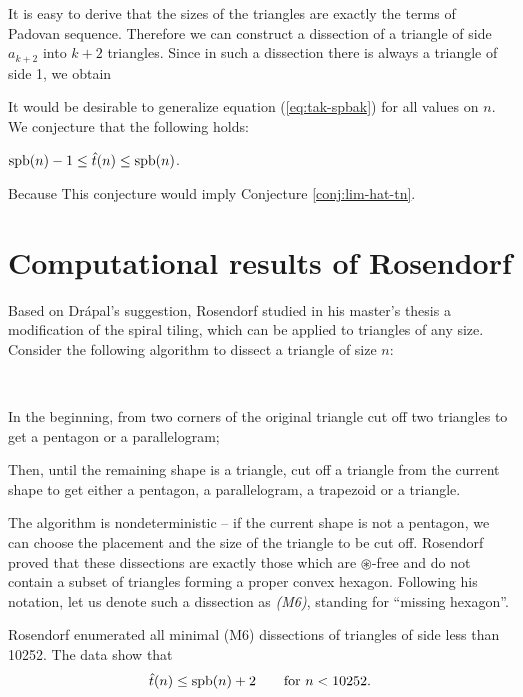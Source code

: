 It is easy to derive that the sizes of the triangles are exactly the terms of Padovan sequence. Therefore we can construct a dissection of a triangle of side $a_{k+2}$ into $k+2$ triangles. Since in such a dissection there is always a triangle of side 1, we obtain
%

It would be desirable to generalize equation (\ref{eq:tak-spbak}) for all values on $n$. We conjecture that the following holds:
\begin{conj}
$\mathop{\mathrm{spb}}(n)-1 \leq \hat t(n) \leq \mathop{\mathrm{spb}}(n)$.
\end{conj}%

\noindent
Because
%
This conjecture would imply Conjecture \ref{conj:lim-hat-tn}.

\section{Computational results of Rosendorf}
Based on Drápal's suggestion, Rosendorf studied in his master's thesis \cite{Rosendorf04} a modification of the spiral tiling, which can be applied to triangles of any size. Consider the following algorithm to dissect a triangle of size $n$:

\begin{alg} \ 
	\begin{cosyitemize}
		\item In the beginning, from two corners of the original triangle cut off two triangles to get a pentagon or a parallelogram;
		\item Then, until the remaining shape is a triangle, cut off a triangle from the current shape to get either a pentagon, a parallelogram, a trapezoid or a triangle.
	\end{cosyitemize}
\end{alg}%

The algorithm is nondeterministic -- if the current shape is not a pentagon, we can choose the placement and the size of the triangle to be cut off. Rosendorf proved that these dissections are exactly those which are $\circledast$-free and do not contain a subset of triangles forming a proper convex hexagon. Following his notation, let us denote such a dissection as \emph{(M6)}, standing for ``missing hexagon''.

Rosendorf enumerated all minimal (M6) dissections of triangles of side less than 10252. The data show that
\begin{align}
	\hat{t}(n) \leq \mathop{\mathrm{spb}}(n)+2 \qquad\hbox{for $n < 10252$.}
\end{align}

